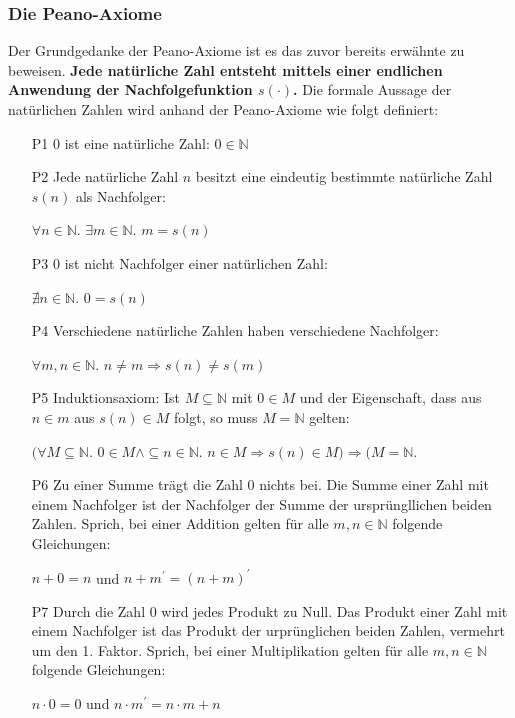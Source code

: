 \documentclass[german,12pt,a4paper]{article}
\begin{document}
\subsubsection{Die Peano-Axiome}\label{Die Peano-Axiome}
Der Grundgedanke der Peano-Axiome ist es das zuvor bereits erwähnte zu beweisen.
\textbf{Jede natürliche Zahl entsteht mittels einer endlichen Anwendung der Nachfolgefunktion $s(\cdot)$.}\newline
Die formale Aussage der natürlichen Zahlen wird anhand der Peano-Axiome wie folgt definiert:
\begin{itemize}
\item [P1] 0 ist eine natürliche Zahl: $0 \in \mathbb{N}$
\item [P2] Jede natürliche Zahl $n$ besitzt eine eindeutig bestimmte natürliche Zahl $s(n)$ als Nachfolger:
\begin{center}
$\forall n \in \mathbb{N}$. $\exists m \in \mathbb{N}$. $m = s(n)$
\end{center}
\item [P3] 0 ist nicht Nachfolger einer natürlichen Zahl:
\begin{center}
$\nexists n \in \mathbb{N}$. $0 = s(n)$
\end{center}
\item [P4] Verschiedene natürliche Zahlen haben verschiedene Nachfolger:
\begin{center}
$\forall m, n \in \mathbb{N}$. $n \neq m \Rightarrow s(n) \neq s(m)$
\end{center}
\item [P5] Induktionsaxiom: Ist $M \subseteq \mathbb{N}$ mit $0 \in M$ und der Eigenschaft, dass aus $n \in m$ aus $s(n) \in M$ folgt, so muss $M = \mathbb{N}$ gelten:
\begin{center}
$(\forall M \subseteq \mathbb{N}$. $0 \in M \land \subseteq n \in \mathbb{N}$. $n \in M \Rightarrow s(n) \in M) \Rightarrow (M = \mathbb{N}$.
\end{center}
\item [P6] Zu einer Summe trägt die Zahl 0 nichts bei.
Die Summe einer Zahl mit einem Nachfolger ist der Nachfolger der Summe der ursprüngllichen beiden Zahlen.
Sprich, bei einer Addition gelten für alle $m, n \in \mathbb{N}$ folgende Gleichungen:
\begin{center}
$n + 0 = n$ und $n + m^\prime = (n + m)^\prime$
\end{center}
\item [P7] Durch die Zahl 0 wird jedes Produkt zu Null.
Das Produkt einer Zahl mit einem Nachfolger ist das Produkt der urprünglichen beiden Zahlen, vermehrt um den 1. Faktor.
Sprich, bei einer Multiplikation gelten für alle $m, n \in \mathbb{N}$ folgende Gleichungen:
\begin{center}
$n \cdot 0 = 0$ und $n \cdot m^\prime = n \cdot m + n$
\end{center}

\end{itemize}
\end{document}
